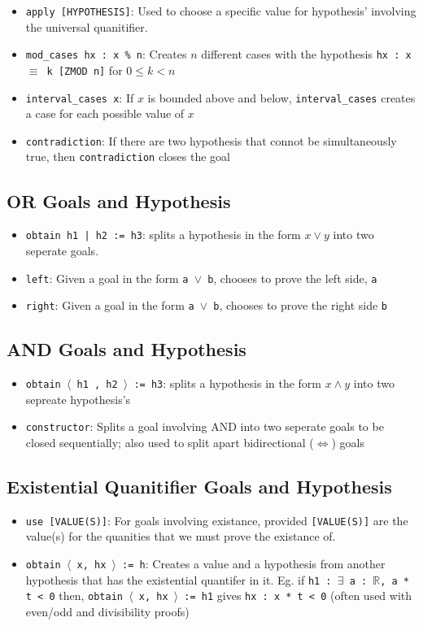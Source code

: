 \documentclass{exam}
\newcommand{\RR}{\mathbb R}
\begin{document}
\begin{itemize}
        \item \verb|apply [HYPOTHESIS]|: Used to choose a specific value for hypothesis' involving the universal quanitifier.
        \item \verb|mod_cases hx : x % n|: Creates $n$ different cases with the hypothesis \texttt{hx : x $\equiv$ k [ZMOD n]} for $0 \leq k < n$
        \item \verb|interval_cases x|: If $x$ is bounded above and below, \texttt{interval\_cases} creates a case for each possible value of $x$
        \item \verb|contradiction|: If there are two hypothesis that connot be simultaneously true, then \verb|contradiction| closes the goal
    \end{itemize}
    \subsection*{OR Goals and Hypothesis}
    \begin{itemize}
        \item \verb+obtain h1 | h2 := h3+: splits a hypothesis in the form $x \lor y$ into two seperate goals.
        \item \verb|left|: Given a goal in the form \texttt{a $\lor$ b}, chooses to prove the left side, \texttt{a}
        \item \verb|right|: Given a goal in the form \texttt{a $\lor$ b}, chooses to prove the right side \texttt{b}
    \end{itemize}
    \subsection*{AND Goals and Hypothesis}
    \begin{itemize}
        \item \texttt{obtain $\langle$ h1 , h2 $\rangle$ := h3}: splits a hypothesis in the form $x \land y$ into two sepreate hypothesis's
        \item \verb|constructor|: Splits a goal involving AND into two seperate goals to be closed sequentially; also used to split apart bidirectional ($\Leftrightarrow$) goals
    \end{itemize}
    \subsection*{Existential Quanitifier Goals and Hypothesis}
    \begin{itemize}
        \item \verb|use [VALUE(S)]|: For goals involving existance, provided \texttt{[VALUE(S)]} are the value(s) for the quanities that we must prove the existance of.
        \item \texttt{obtain $\langle$ x, hx $\rangle$ := h}: Creates a value and a hypothesis from another hypothesis that has the existential quantifer in it. Eg. if \texttt{h1 : $\exists$ a : $\RR$, a * t < 0} then, \texttt{obtain $\langle$ x, hx $\rangle$ := h1} gives \texttt{hx : x * t < 0} (often used with even/odd and divisibility proofs)
    \end{itemize}
\end{document}
